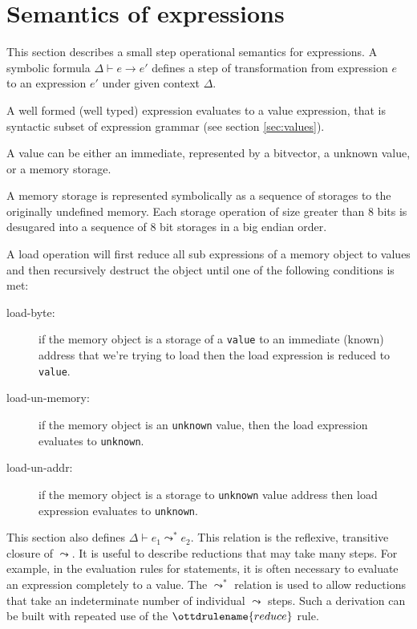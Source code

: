 \documentclass[11pt]{article}
\begin{document}
\section {Semantics of expressions}
\label{sec:sema:exp}

This section describes a small step operational semantics for
expressions. A symbolic formula $\Delta \vdash e \rightarrow e' $
defines a step of transformation from expression $e$ to an expression
$e'$ under given context $\Delta$.

A well formed (well typed) expression evaluates to a value expression,
that is syntactic subset of expression grammar (see
section \ref{sec:values}).

A value can be either an immediate, represented by a bitvector, a
unknown value, or a memory storage.

A memory storage is represented symbolically as a sequence of
storages to the originally undefined memory. Each storage
operation of size greater than 8 bits is desugared into a sequence of
8 bit storages in a big endian order.

A load operation will first reduce all sub expressions of a memory
object to values and then recursively destruct the object until one of
the following conditions is met:


\begin{description}
\item[load-byte:] if the memory object is a storage of a \verb|value|
  to an immediate (known) address that we're trying to load then the
  load expression is reduced to \verb|value|.
\item[load-un-memory:] if the memory object is an \verb|unknown| value,
  then the load expression evaluates to \verb|unknown|.
\item[load-un-addr:] if the memory object is a storage to
  \verb|unknown| value address then load expression evaluates to
  \verb|unknown|.
\end{description}

This section also defines $\Delta \vdash e_1 \leadsto^{*} e_2$.  This relation
is the reflexive, transitive closure of $\leadsto$.  It is useful to describe
reductions that may take many steps.  For example, in the evaluation rules for
statements, it is often necessary to evaluate an expression completely to a
value.  The $\leadsto^{*}$ relation is used to allow reductions that take an
indeterminate number of individual $\leadsto$ steps.  Such a derivation can be
built with repeated use of the $\ottdrulename{reduce}$ rule.

\medskip

\ottdefnsreduceXXexp

\ottdefnshelpers

\ottdefnsmultistepXXexp
\end{document}
